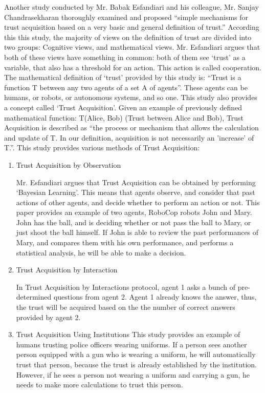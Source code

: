 \documentclass[runningheads,a4paper]{llncs}
\begin{document}
Another study conducted by Mr. Babak Esfandiari and his colleague, Mr. Sanjay Chandrasekharan \cite{esfandiari2001agents} thoroughly examined and proposed ``simple
mechanisms for trust acquisition based on a very basic and general definition of trust.'' According this this study, the majority of views on the definition of trust are divided into two groups: Cognitive views, and mathematical views. Mr. Esfandiari argues that both of these views have something in common: both of them see `trust' as a variable, that also has a threshold for an action. This action is called cooperation. The mathematical definition of `trust' provided by this study is: ``Trust is a function T between any two agents of a set A of agents''. These agents can be humans, or robots, or autonomous systems, and so one. This study also provides a concept called `Trust Acquisition'. Given an example of previously defined mathematical function: T(Alice, Bob) (Trust between Alice and Bob), Trust Acquisition is described as ``the process or mechanism that allows the calculation and update of T. In our
definition, acquisition is not necessarily an 'increase' of T.''. This study provides various methods of Trust Acquisition:
\begin{enumerate}
	\item Trust Acquisition by Observation
	
	Mr. Esfandiari argues that Trust Acquisition can be obtained by performing `Bayesian Learning'. This means that agents observe, and consider that past actions of other agents, and decide whether to perform an action or not. This paper provides an example of two agents, RoboCop robots John and Mary. John has the ball, and is deciding whether or not pass the ball to Mary, or just shoot the ball himself. If John is able to review the past performances of Mary, and compares them with his own performance, and performs a statistical analysis, he will be able to make a decision.
	\item Trust Acquisition by Interaction
	
	In Trust Acquisition by Interactions protocol, agent 1 asks a bunch of pre-determined questions from agent 2. Agent 1 already knows the answer, thus, the trust will be acquired based on the the number of correct answers provided by agent 2.
	\item Trust Acquisition Using Institutions
	This study provides an example of humans trusting police officers wearing uniforms. If a person sees another person equipped with a gun who is wearing a uniform, he will automatically trust that person, because the trust is already established by the institution. However, if he sees a person not wearing a uniform and carrying a gun, he needs to make more calculations to trust this person.
	
\end{enumerate}
\end{document}
